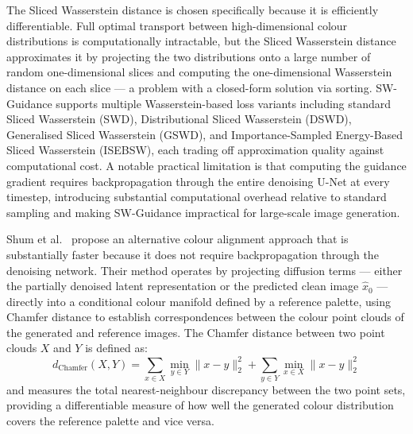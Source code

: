 The Sliced Wasserstein distance is chosen specifically because it 
is efficiently differentiable. Full optimal transport between 
high-dimensional colour distributions is computationally 
intractable, but the Sliced Wasserstein distance approximates it 
by projecting the two distributions onto a large number of random 
one-dimensional slices and computing the one-dimensional Wasserstein 
distance on each slice — a problem with a closed-form solution via 
sorting. SW-Guidance supports multiple Wasserstein-based loss 
variants including standard Sliced Wasserstein (SWD), 
Distributional Sliced Wasserstein (DSWD), Generalised Sliced 
Wasserstein (GSWD), and Importance-Sampled Energy-Based Sliced 
Wasserstein (ISEBSW), each trading off approximation quality 
against computational cost. A notable practical limitation is that 
computing the guidance gradient requires backpropagation through 
the entire denoising U-Net at every timestep, introducing 
substantial computational overhead relative to standard sampling 
and making SW-Guidance impractical for large-scale image generation.

Shum et al.\ \cite{Shum_2025_ColorAlignment} propose an alternative 
colour alignment approach that is substantially faster because it 
does not require backpropagation through the denoising network. 
Their method operates by projecting diffusion terms — either the 
partially denoised latent representation or the predicted clean 
image $\hat{x}_0$ — directly into a conditional colour manifold 
defined by a reference palette, using Chamfer distance to establish 
correspondences between the colour point clouds of the generated 
and reference images. The Chamfer distance between two point clouds 
$X$ and $Y$ is defined as:
\begin{equation}
	d_\text{Chamfer}(X, Y) = \sum_{x \in X} \min_{y \in Y} 
	\|x - y\|_2^2 + \sum_{y \in Y} \min_{x \in X} \|x - y\|_2^2
\end{equation}
and measures the total nearest-neighbour discrepancy between the 
two point sets, providing a differentiable measure of how well the 
generated colour distribution covers the reference palette and 
vice versa.

